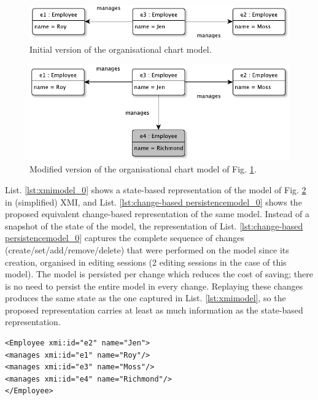 \documentclass[12pt, a4paper]{report} \usepackage[titletoc]{appendix}
\begin{document}
\begin{figure}[ht]
	\centering
	\includegraphics[width=\linewidth]{initial_chart_0}
	\caption{Initial version of the organisational chart model.}
	\label{fig:initial_chart_0}
\end{figure}

\begin{figure}[ht]
	\centering
	\includegraphics[width=\linewidth]{modified_chart}
	\caption{Modified version of the organisational chart model of Fig. \ref{fig:initial_chart_0}.}
	\label{fig:modified_chart}
\end{figure}

List. \ref{lst:xmimodel_0} shows a state-based representation of the model of Fig. \ref{fig:modified_chart} in (simplified) XMI, and List. \ref{lst:change-based persistencemodel_0} shows the proposed equivalent change-based representation of the same model. Instead of a snapshot of the state of the model, the representation of List. \ref{lst:change-based persistencemodel_0} captures the complete sequence of changes (create/set/add/remove/delete) that were performed on the model since its creation, organised in editing sessions (2 editing sessions in the case of this model). The model is persisted per change which reduces the cost of saving; there is no need to persist the entire model in every change.  Replaying these changes produces the same state as the one captured in List. \ref{lst:xmimodel}, so the proposed representation carries at least as much information as the state-based representation.

\begin{lstlisting}[style=xmi,caption={State-based representation of the model of Figure \ref{fig:modified_chart} in (simplified) XMI.},label=lst:xmimodel_0]
<Employee xmi:id="e2" name="Jen">
<manages xmi:id="e1" name="Roy"/>
<manages xmi:id="e3" name="Moss"/>
<manages xmi:id="e4" name="Richmond"/>
</Employee>
\end{lstlisting}
\end{document}

